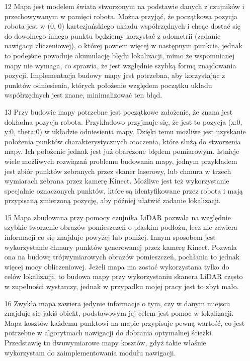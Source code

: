 \documentclass[20pt,a4paper]{article}
\begin{document}
\begin{itemize}
    \item[12]
    Mapa jest modelem świata stworzonym na podstawie danych z czujników i przechowywanym w pamięci robota. 
    Można przyjąć, że początkowa pozycja robota jest w (0, 0) kartezjańskiego układu współrzędnych i chcąc dostać się do  dowolnego innego punktu będziemy korzystać z odometrii (zadanie nawigacji zliczeniowej), o której powiem więcej w następnym punkcie, jednak to podejście powoduje akumulację błędu lokalizacji, mimo że wspomnianej mapy nie wymaga, co sprawia, że jest względnie szybką formą znajdowania pozycji.
    Implementacja budowy mapy jest potrzebna, aby korzystając z punktów odniesienia, których położenie względem początku układu współrzędnych jest znane, minimalizować ten błąd.
    \item[13]
    Przy budowie mapy potrzebne jest początkowe założenie, że znana jest dokładna pozycja robota. 
    Przykładowo przyjmuje się, że jest to pozycja (x:0, y:0, theta:0) w układzie odniesienia mapy.
    Dzięki temu możliwe jest uzyskanie położenia punktów charakterystycznych otoczenia, które służą do stworzenia mapy. Ich położenie jednak jest już obarczone błędem pomiarowym.
    Istnieje wiele możliwych rozwiązań problemu budowania mapy, jednym przykładem jest zbiór punktów zebranych przez skaner laserowy, lub chmura w trzech wymiarach zebrana przez kamerę Kinect.
    Możliwe jest też wykorzystanie specjalnie oznaczonych punktów, które są identyfikowane przez robota i mają przypisaną zmierzoną pozycję, aby później ułatwić zadanie lokalizacji.
    \item[15]
    Mapa zbudowana przy pomocy czujnika LiDAR pozwala na względnie szybkie tworzenie obrazów pomieszczeń o płaskim podłożu, lecz nie zawiera informacji co się znajduje powyżej lub poniżej.
   Innym sposobem jest wykorzystanie chmury punktów generowanej przez kamerę Kinect. Pozwala ona na budowę trójwymiarowych obrazów pomieszczeń, pochłania to jednak więcej mocy obliczeniowej. 
    Jeżeli mapa ma zostać wykorzystana tylko do celów lokalizacji, to budowa mapy przy wykorzystaniu skanera LiDAR często w zupełności wystarczy, jednak w przypadku mojej pracy jest to zbyt mało.
    \item[16]
    Zwykła mapa zawiera jedynie informacje o tym, czy w danym miejscu znajduje się jakiś obiekt, podstawowym jej celem jest pomoc w lokalizacji.
Mapa kosztów każdemu punktowi na mapie przypisuje pewną wartość, co jest potrzebne w algorytmach nawigacji do dobrania optymalnej ścieżki. 
Przedstawię tu dwuwymiarowe mapy kosztów, gdyż takie właśnie wykorzystam do zaimplementowania modułu nawigacji. 

\end{itemize}
\end{document}
